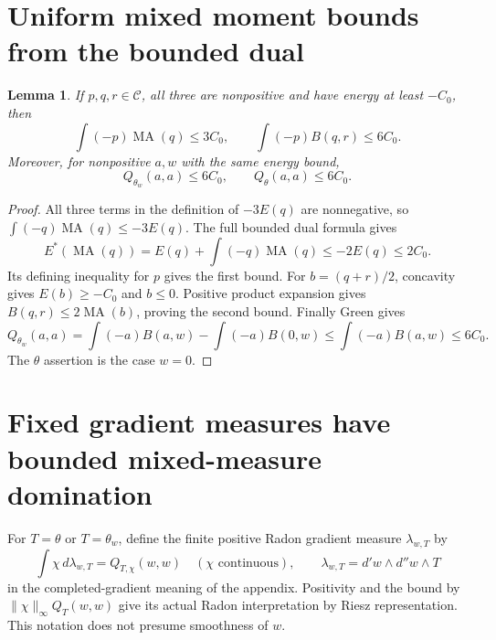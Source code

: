 \documentclass[11pt]{article}
\newcommand{\MA}{\operatorname{MA}}
\newcommand{\C}{\mathcal C}
\newtheorem{lemma}[theorem]{Lemma}
\theoremstyle{remark}\newtheorem{remark}[theorem]{Remark}
\begin{document}
\section{Uniform mixed moment bounds from the bounded dual}
\begin{lemma}\label{mixed}
If $p,q,r\in\C$, all three are nonpositive and have energy at
least $-C_0$, then
\[
 \int(-p)\MA(q)\le3C_0,\qquad
 \int(-p)B(q,r)\le6C_0.
\]
Moreover, for nonpositive $a,w$ with the same energy bound,
\[
 Q_{\theta_w}(a,a)\le6C_0,\qquad Q_\theta(a,a)\le6C_0.
\]
\end{lemma}
\begin{proof}
All three terms in the definition of $-3E(q)$ are nonnegative,
so $\int(-q)\MA(q)\le-3E(q)$. The full bounded dual formula gives
\[
 E^*(\MA(q))=E(q)+\int(-q)\MA(q)\le-2E(q)\le2C_0.
\]
Its defining inequality for $p$ gives the first bound.
For $b=(q+r)/2$, concavity gives $E(b)\ge-C_0$ and $b\le0$.
Positive product expansion gives $B(q,r)\le2\MA(b)$, proving
the second bound. Finally Green gives
\[
 Q_{\theta_w}(a,a)=\int(-a)B(a,w)-\int(-a)B(0,w)
 \le\int(-a)B(a,w)\le6C_0.
\]
The $\theta$ assertion is the case $w=0$.
\end{proof}

\section{Fixed gradient measures have bounded mixed-measure domination}
For $T=\theta$ or $T=\theta_w$, define the finite positive
Radon gradient measure $\lambda_{w,T}$ by
\[
 \int\chi\,d\lambda_{w,T}=Q_{T,\chi}(w,w)
 \quad(\chi\text{ continuous}),\qquad
 \lambda_{w,T}=d'w\wedge d''w\wedge T
\]
in the completed-gradient meaning of the appendix. Positivity
and the bound by $\|\chi\|_\infty Q_T(w,w)$ give its actual
Radon interpretation by Riesz representation. This notation
does not presume smoothness of $w$.
\end{document}

